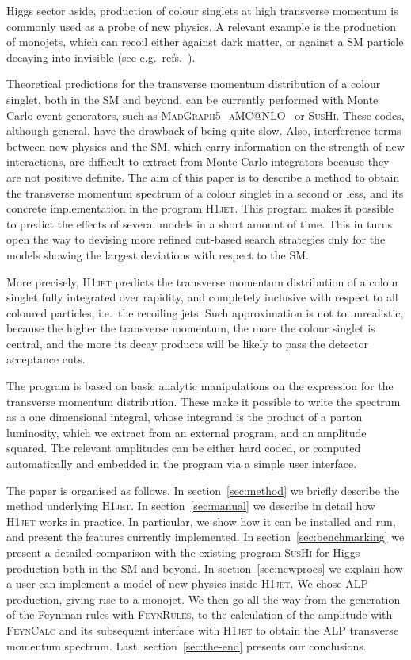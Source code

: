 \documentclass[12pt]{article}
\begin{document}
Higgs sector aside, production of colour singlets at high transverse
momentum is commonly used as a probe of new physics. A relevant
example is the production of monojets, which can recoil
either against dark matter, or against a SM particle decaying into
invisible (see e.g.\ refs.~\cite{Sirunyan:2017hci,Aaboud:2019yqu}).

Theoretical predictions for the transverse momentum distribution of a
colour singlet, both in the SM and beyond, can be currently performed
with Monte Carlo event generators, such as
\textsc{MadGraph5\_aMC@NLO}~\cite{Alwall:2014hca} or
\textsc{SusHi}\cite{Harlander:2012pb,Harlander:2016hcx}. These codes,
although general, have the drawback of being quite slow. Also,
interference terms between new physics and the SM, which
carry information on the strength of new interactions, are difficult
to extract from Monte Carlo integrators because they are not positive
definite. The aim of this paper is to describe a method to obtain the
transverse momentum spectrum of a colour singlet in a second or less,
and its concrete implementation in the program \textsc{H1jet}. This program
makes it possible to predict the effects of several models in a short
amount of time. This in turns open the way to devising more refined
cut-based search strategies only for the models showing the largest
deviations with respect to the SM.

More precisely, \textsc{H1jet} predicts the transverse momentum distribution of
a colour singlet fully integrated over rapidity, and completely
inclusive with respect to all coloured particles, i.e.\ the recoiling
jets. Such approximation is not to unrealistic, because the higher the
transverse momentum, the more the colour singlet is central, and the
more its decay products will be likely to pass the detector acceptance
cuts.

The program is based on basic analytic manipulations on the expression
for the transverse momentum distribution. These make it possible to
write the spectrum as a one dimensional integral, whose integrand is
the product of a parton luminosity, which we extract from an external
program, and an amplitude squared. The relevant amplitudes can be
either hard coded, or computed automatically and embedded in the program
via a simple user interface.

The paper is organised as follows. In section~\ref{sec:method} we
briefly describe the method underlying \textsc{H1jet}. In
section~\ref{sec:manual} we describe in detail how \textsc{H1jet}
works in practice. In particular, we show how it can be installed and
run, and present the features currently implemented. In
section~\ref{sec:benchmarking} we present a detailed comparison with
the existing program \textsc{SusHi} for Higgs production both in the
SM and beyond. In section~\ref{sec:newprocs} we explain how a user can
implement a model of new physics inside \textsc{H1jet}. We chose ALP
production, giving rise to a monojet. We then go all the way from the
generation of the Feynman rules with \textsc{FeynRules}, to the
calculation of the amplitude with \textsc{FeynCalc} and its subsequent
interface with \textsc{H1jet} to obtain the ALP transverse momentum
spectrum. Last, section~\ref{sec:the-end} presents our conclusions.
\end{document}

